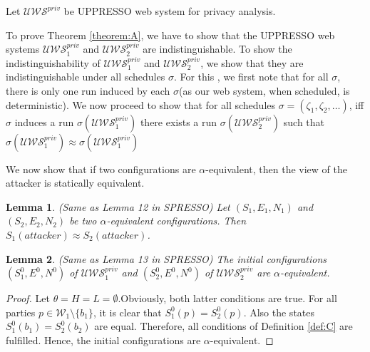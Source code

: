 \documentclass[letterpaper,onecolumn,10pt]{article}
\newtheorem{lemma}{Lemma}
\begin{document}
Let $\mathcal{U\!W\!S}^{priv}$ be UPPRESSO web system for privacy analysis.\par
To prove Theorem \ref{theorem:A}, we have to show that the UPPRESSO web systems $\mathcal{U\!W\!S}^{priv}_1$ and $\mathcal{U\!W\!S}^{priv}_2$ 
are indistinguishable. To show the indistinguishability of $\mathcal{U\!W\!S}^{priv}_1$ and $\mathcal{U\!W\!S}^{priv}_2$, 
we show that they are indistinguishable under all schedules $\sigma$.
For this , we first note that for all $\sigma$, there is only one run induced by each $\sigma$(as our web system, when scheduled, is deterministic).
We now proceed to show that for all schedules $\sigma=(\zeta _1, \zeta_2,\dots)$, iff $\sigma$ induces a run $\sigma(\mathcal{U\!W\!S}^{priv}_1)$ there exists a run $\sigma(\mathcal{U\!W\!S}^{priv}_2)$ such that $\sigma(\mathcal{U\!W\!S}^{priv}_1)\approx\sigma(\mathcal{U\!W\!S}^{priv}_1)$\par
We now show that if two configurations are $\alpha$-equivalent, then the view of the attacker is statically equivalent.

\begin{lemma}
  (Same as Lemma 12 in SPRESSO) Let $(S_1,E_1,N_1)$ and $(S_2,E_2,N_2)$ be two $\alpha$-equivalent configurations. Then $S_1(attacker)\approx S_2(attacker)$.
\end{lemma}

\begin{lemma}
  (Same as Lemma 13 in SPRESSO) The initial configurations $(S_1^0,E^0,N^0)$ of $\mathcal{U\!W\!S}^{priv}_1$ and $(S_2^0,E^0,N^0)$ of $\mathcal{U\!W\!S}^{priv}_2$ are $\alpha$-equivalent.
\end{lemma}
\begin{proof}
  Let $\theta=H=L=\emptyset$.Obviously, both latter conditions are true. For all parties $p\in\mathcal{W}_1\setminus\{b_1\}$, it is clear that $S^0_1(p)=S^0_2(p)$.
  Also the states $S^0_1(b_1)=S^0_2(b_2)$ are equal. Therefore, all conditions of Definition \ref{def:C} are fulfilled. Hence, the  initial configurations are $\alpha$-equivalent.
\end{proof}
\end{document}
